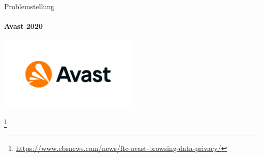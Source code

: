 \documentclass[
    ngerman,%
    authorontitle=true,
]{bfhbeamer}
\begin{document}
    \begin{frame}{Problemstellung}
        \framesubtitle{Avast 2020}
        \begin{center}
            \includegraphics[width=0.5\textwidth]{assets/presentation/avast-logo}
        \end{center}
        \footnote{\url{https://www.cbsnews.com/news/ftc-avast-browsing-data-privacy/}}
    \end{frame}
\end{document}
